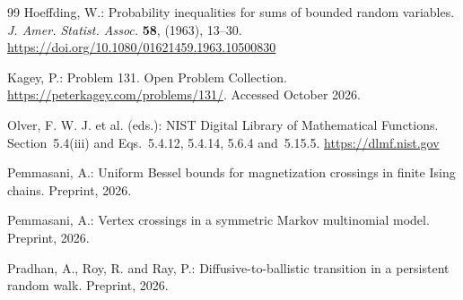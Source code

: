 \begin{thebibliography}{99}
 Hoeffding, W.: Probability inequalities for sums of
  bounded random variables. \emph{J. Amer. Statist. Assoc.} \textbf{58},
  (1963), 13--30. \url{https://doi.org/10.1080/01621459.1963.10500830}

 Kagey, P.: Problem 131. Open Problem Collection.
  \url{https://peterkagey.com/problems/131/}. Accessed October 2026.

 Olver, F. W. J. et al. (eds.): NIST Digital Library of
  Mathematical Functions. Section~5.4(iii) and Eqs.~5.4.12, 5.4.14, 5.6.4
  and~5.15.5. \url{https://dlmf.nist.gov}

 Pemmasani, A.: Uniform Bessel bounds for magnetization
  crossings in finite Ising chains. Preprint, 2026. 

 Pemmasani, A.: Vertex crossings in a symmetric Markov
  multinomial model. Preprint, 2026. 

 Pradhan, A., Roy, R. and Ray, P.: Diffusive-to-ballistic
  transition in a persistent random walk. Preprint, 2026. 

\end{thebibliography}
